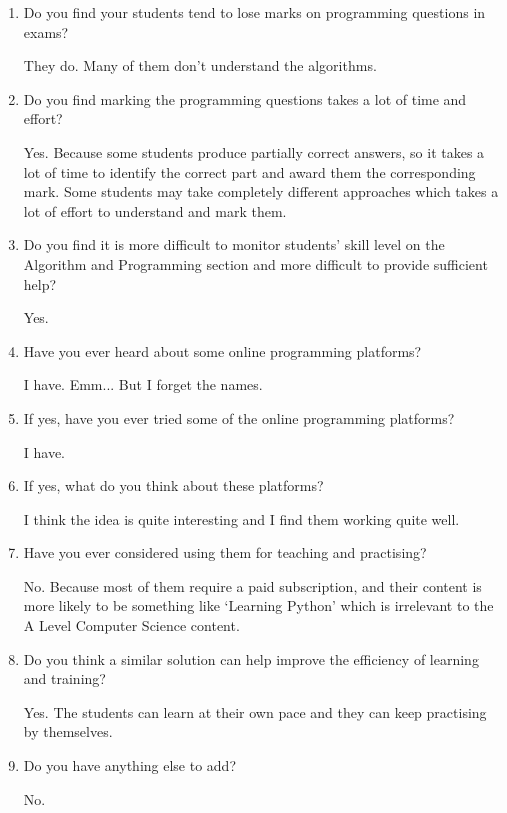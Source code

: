 \documentclass[a4paper]{report}
\begin{document}
\begin{enumerate}
    \item Do you find your students tend to lose marks on programming questions in exams?

          They do. Many of them don't understand the algorithms.

    \item Do you find marking the programming questions takes a lot of time and effort?

          Yes. Because some students produce partially correct answers, so it takes a lot of time to identify the correct part and award them the corresponding mark. Some students may take completely different approaches which takes a lot of effort to understand and mark them.

    \item Do you find it is more difficult to monitor students' skill level on the Algorithm and Programming section and more difficult to provide sufficient help?

          Yes.

    \item Have you ever heard about some online programming platforms?

          I have. Emm... But I forget the names.

    \item If yes, have you ever tried some of the online programming platforms?

          I have.

    \item If yes, what do you think about these platforms?

          I think the idea is quite interesting and I find them working quite well.

    \item Have you ever considered using them for teaching and practising?

          No. Because most of them require a paid subscription, and their content is more likely to be something like `Learning Python' which is irrelevant to the A Level Computer Science content.

    \item Do you think a similar solution can help improve the efficiency of learning and training?

          Yes. The students can learn at their own pace and they can keep practising by themselves.

    \item Do you have anything else to add?

          No.
\end{enumerate}
\end{document}
